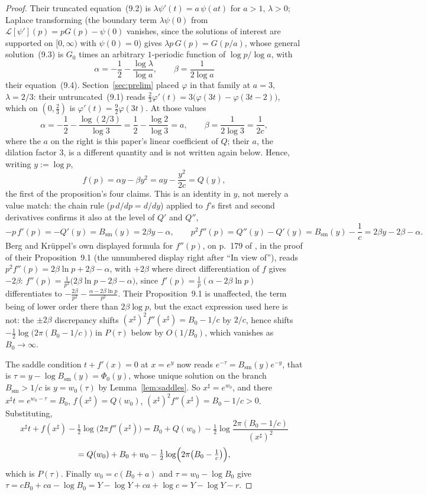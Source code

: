 \documentclass[11pt]{amsart}
\theoremstyle{plain}
\theoremstyle{definition}
\theoremstyle{remark}
\begin{document}
\begin{proof}
Their truncated equation~(9.2) is $\lambda \psi'(t) = a\,\psi(at)$ for $a>1$, $\lambda>0$; Laplace
transforming (the boundary term $\lambda\psi(0)$ from $\mathcal L[\psi'](p)=pG(p)-\psi(0)$ vanishes,
since the solutions of interest are supported on $[0,\infty)$ with $\psi(0)=0$) gives $\lambda
p\,G(p) = G(p/a)$, whose general solution~(9.3) is $G_0$ times an arbitrary $1$-periodic function
of $\log p/\log a$, with
\[
\alpha = -\frac12-\frac{\log\lambda}{\log a}, \qquad \beta = \frac{1}{2\log a}
\]
their equation~(9.4). Section~\ref{sec:prelim} placed $\varphi$ in that family at $a=3$,
$\lambda=2/3$: their untruncated~(9.1) reads $\tfrac23\varphi'(t) = 3\bigl(\varphi(3t) -
\varphi(3t-2)\bigr)$, which on $(0,\tfrac23)$ is $\varphi'(t) = \tfrac92\varphi(3t)$. At those
values
\[
\alpha = -\frac12-\frac{\log(2/3)}{\log3} = \frac12-\frac{\log2}{\log3} = a, \qquad
\beta = \frac{1}{2\log3} = \frac{1}{2c},
\]
where the $a$ on the right is this paper's linear coefficient of $Q$; their $a$, the dilation
factor $3$, is a different quantity and is not written again below. Hence, writing $y := \log p$,
\[
f(p) = \alpha y-\beta y^2 = a y - \frac{y^2}{2c} = Q(y),
\]
the first of the proposition's four claims. This is an identity in $y$, not merely a value match:
the chain rule ($p\,d/dp = d/dy$) applied to $f$'s first and second derivatives confirms it also at
the level of $Q'$ and $Q''$,
\[
-p\,f'(p) = -Q'(y) = B_{\mathrm{sm}}(y) = 2\beta y-\alpha, \qquad
p^2f''(p) = Q''(y)-Q'(y) = B_{\mathrm{sm}}(y)-\frac1c = 2\beta y-2\beta-\alpha .
\]
Berg and Kr\"uppel's own displayed formula for $f''(p)$, on p.~179 of \cite{bergkruppel1998}, in
the proof of their Proposition~9.1 (the unnumbered display right after ``In view of''), reads
$p^2f''(p)=2\beta\ln p+2\beta-\alpha$,
with $+2\beta$ where direct differentiation of $f$ gives $-2\beta$: $f''(p) =
\tfrac{1}{p^2}\bigl(2\beta\ln p - 2\beta - \alpha\bigr)$, since $f'(p)=\tfrac1p(\alpha-2\beta\ln p)$
differentiates to $-\tfrac{2\beta}{p^2}-\tfrac{\alpha-2\beta\ln p}{p^2}$. Their Proposition~9.1 is
unaffected, the term being of lower order there than $2\beta\log p$, but the exact expression used
here is not: the $\pm2\beta$ discrepancy shifts $(x^\sharp)^2f''(x^\sharp) = B_0-1/c$ by $2/c$, hence
shifts $-\tfrac12\log\bigl(2\pi(B_0-1/c)\bigr)$ in $P(\tau)$ below by $O(1/B_0)$, which vanishes as
$B_0\to\infty$.

The saddle condition $t+f'(x)=0$ at $x=e^y$ now reads $e^{-\tau} = B_{\mathrm{sm}}(y)e^{-y}$, that
is $\tau = y-\log B_{\mathrm{sm}}(y) = \Phi_0(y)$, whose unique solution on the branch
$B_{\mathrm{sm}}>1/c$ is $y = w_0(\tau)$ by Lemma~\ref{lem:saddles}. So $x^\sharp = e^{w_0}$, and
there $x^\sharp t = e^{w_0-\tau} = B_0$, $f(x^\sharp) = Q(w_0)$, $(x^\sharp)^2f''(x^\sharp) = B_0 -
1/c>0$. Substituting,
\[
x^\sharp t+f(x^\sharp)-\tfrac12\log\bigl(2\pi f''(x^\sharp)\bigr)
= B_0+Q(w_0)-\tfrac12\log\frac{2\pi(B_0-1/c)}{(x^\sharp)^2}
\]
\[
= Q(w_0)+B_0+w_0-\tfrac12\log\Bigl(2\pi\bigl(B_0-\tfrac1c\bigr)\Bigr),
\]
which is $P(\tau)$. Finally $w_0 = c(B_0+a)$ and $\tau = w_0-\log B_0$ give $\tau = cB_0+ca-\log
B_0 = Y-\log Y+ca+\log c = Y-\log Y-r$.
\end{proof}
\end{document}
